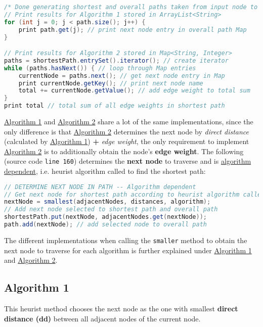 \begin{lstlisting}[language=Java]
/* Done generating shortest and overall paths taken from input node to destination Z */
// Print results for Algorithm 1 stored in ArrayList<String>
for (int j = 0; j < path.size(); j++) {
    print path.get(j); // print next node entry in overall path Map
}

// Print results for Algorithm 2 stored in Map<String, Integer>
paths = shortestPath.entrySet().iterator(); // create iterator
while (paths.hasNext()) { // loop through Map entries
    currentNode = paths.next(); // get next node entry in Map
    print currentNode.getKey(); // print next node name
    total += currentNode.getValue(); // add edge weight to total sum
}
print total // total sum of all edge weights in shortest path
\end{lstlisting}

\hyperref[algo1]{Algorithm 1} and \hyperref[algo2]{Algorithm 2} share a lot of the same implementations, since the only difference is that \hyperref[algo2]{Algorithm 2} determines the next node by \emph{direct distance} (calculated by \hyperref[algo1]{Algorithm 1}) \textbf{+} \emph{edge weight}, the only requirement to implement \hyperref[algo2]{Algorithm 2} is to additionally obtain the node's \textbf{edge weight}. The following (source code \texttt{line 160}) determines the \textbf{next node} to traverse and is \underline{algorithm dependent}, i.e. heurist algorithm called to find the shortest path:

\begin{lstlisting}[language=Java]
// DETERMINE NEXT NODE IN PATH -- Algorithm dependent
// Get next node for shortest path according to heurist algorithm called (algorithm == 1 or 2)
nextNode = smallest(adjacentNodes, distances, algorithm);
// Add next node selected to shortest path and overall path
shortestPath.put(nextNode, adjacentNodes.get(nextNode));
path.add(nextNode); // add selected node to overall path
\end{lstlisting}

The different implementations when calling the \texttt{smaller} method to obtain the next node to traverse for each algorithm is further explained under \hyperref[algo1]{Algorithm 1} and \hyperref[algo2]{Algorithm 2}.

\newpage

\subsection*{Algorithm 1}
\label{algo1}
This heurist method chooses the next node as the one with smallest \textbf{direct distance (dd)} between all adjacent nodes of the current node.

